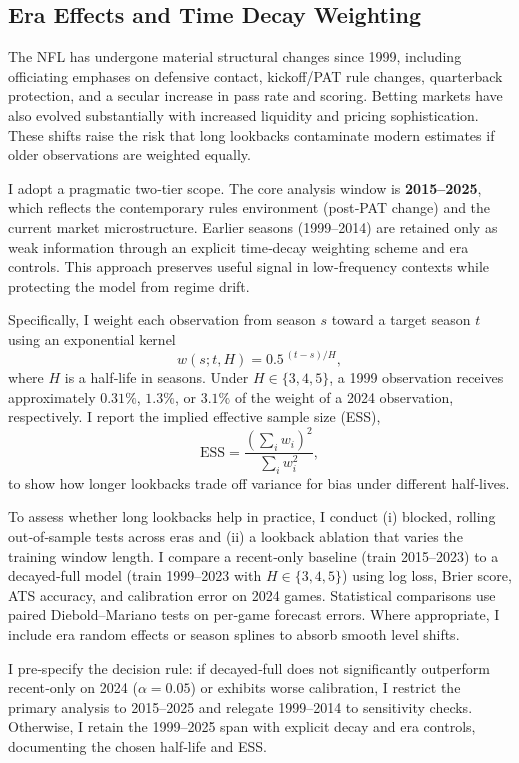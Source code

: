 \subsection{Era Effects and Time Decay Weighting}
\label{subsec:era-effects}
The NFL has undergone material structural changes since 1999, including officiating emphases on defensive contact, kickoff/PAT rule changes, quarterback protection, and a secular increase in pass rate and scoring. Betting markets have also evolved substantially with increased liquidity and pricing sophistication. These shifts raise the risk that long lookbacks contaminate modern estimates if older observations are weighted equally.

I adopt a pragmatic two‑tier scope. The core analysis window is \textbf{2015--2025}, which reflects the contemporary rules environment (post‑PAT change) and the current market microstructure. Earlier seasons (1999--2014) are retained only as weak information through an explicit time‑decay weighting scheme and era controls. This approach preserves useful signal in low‑frequency contexts while protecting the model from regime drift.

Specifically, I weight each observation from season $s$ toward a target season $t$ using an exponential kernel
\begin{equation}
w(s; t, H) = 0.5^{\,(t - s)/H},
\end{equation}
where $H$ is a half‑life in seasons. Under $H\in\{3,4,5\}$, a 1999 observation receives approximately $0.31\%$, $1.3\%$, or $3.1\%$ of the weight of a 2024 observation, respectively. I report the implied effective sample size (ESS),
\begin{equation}
\mathrm{ESS} = \frac{\left(\sum_i w_i\right)^2}{\sum_i w_i^2},
\end{equation}
to show how longer lookbacks trade off variance for bias under different half‑lives.

To assess whether long lookbacks help in practice, I conduct (i) blocked, rolling out‑of‑sample tests across eras and (ii) a lookback ablation that varies the training window length. I compare a recent‑only baseline (train 2015--2023) to a decayed‑full model (train 1999--2023 with $H\in\{3,4,5\}$) using log loss, Brier score, ATS accuracy, and calibration error on 2024 games. Statistical comparisons use paired Diebold--Mariano tests on per‑game forecast errors. Where appropriate, I include era random effects or season splines to absorb smooth level shifts.

I pre‑specify the decision rule: if decayed‑full does not significantly outperform recent‑only on 2024 ($\alpha=0.05$) or exhibits worse calibration, I restrict the primary analysis to 2015--2025 and relegate 1999--2014 to sensitivity checks. Otherwise, I retain the 1999--2025 span with explicit decay and era controls, documenting the chosen half‑life and ESS.

